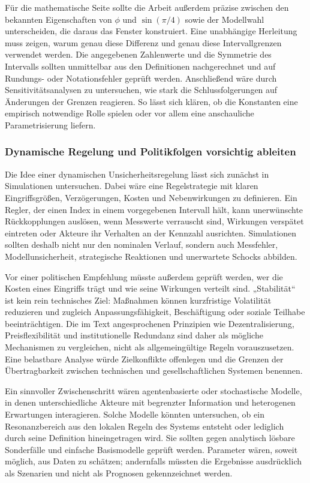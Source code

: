 \documentclass[a4paper,12pt,twoside]{report}
\theoremstyle{definition}
\begin{document}
Für die mathematische Seite sollte die Arbeit außerdem präzise zwischen den bekannten Eigenschaften von $\phi$ und $\sin(\pi/4)$ sowie der Modellwahl unterscheiden, die daraus das Fenster konstruiert. Eine unabhängige Herleitung muss zeigen, warum genau diese Differenz und genau diese Intervallgrenzen verwendet werden. Die angegebenen Zahlenwerte und die Symmetrie des Intervalls sollten unmittelbar aus den Definitionen nachgerechnet und auf Rundungs- oder Notationsfehler geprüft werden. Anschließend wäre durch Sensitivitätsanalysen zu untersuchen, wie stark die Schlussfolgerungen auf Änderungen der Grenzen reagieren. So lässt sich klären, ob die Konstanten eine empirisch notwendige Rolle spielen oder vor allem eine anschauliche Parametrisierung liefern.

\subsubsection{Dynamische Regelung und Politikfolgen vorsichtig ableiten}

Die Idee einer dynamischen Unsicherheitsregelung lässt sich zunächst in Simulationen untersuchen. Dabei wäre eine Regelstrategie mit klaren Eingriffsgrößen, Verzögerungen, Kosten und Nebenwirkungen zu definieren. Ein Regler, der einen Index in einem vorgegebenen Intervall hält, kann unerwünschte Rückkopplungen auslösen, wenn Messwerte verrauscht sind, Wirkungen verspätet eintreten oder Akteure ihr Verhalten an der Kennzahl ausrichten. Simulationen sollten deshalb nicht nur den nominalen Verlauf, sondern auch Messfehler, Modellunsicherheit, strategische Reaktionen und unerwartete Schocks abbilden.

Vor einer politischen Empfehlung müsste außerdem geprüft werden, wer die Kosten eines Eingriffs trägt und wie seine Wirkungen verteilt sind. „Stabilität“ ist kein rein technisches Ziel: Maßnahmen können kurzfristige Volatilität reduzieren und zugleich Anpassungsfähigkeit, Beschäftigung oder soziale Teilhabe beeinträchtigen. Die im Text angesprochenen Prinzipien wie Dezentralisierung, Preisflexibilität und institutionelle Redundanz sind daher als mögliche Mechanismen zu vergleichen, nicht als allgemeingültige Regeln vorauszusetzen. Eine belastbare Analyse würde Zielkonflikte offenlegen und die Grenzen der Übertragbarkeit zwischen technischen und gesellschaftlichen Systemen benennen.

Ein sinnvoller Zwischenschritt wären agentenbasierte oder stochastische Modelle, in denen unterschiedliche Akteure mit begrenzter Information und heterogenen Erwartungen interagieren. Solche Modelle könnten untersuchen, ob ein Resonanzbereich aus den lokalen Regeln des Systems entsteht oder lediglich durch seine Definition hineingetragen wird. Sie sollten gegen analytisch lösbare Sonderfälle und einfache Basismodelle geprüft werden. Parameter wären, soweit möglich, aus Daten zu schätzen; andernfalls müssten die Ergebnisse ausdrücklich als Szenarien und nicht als Prognosen gekennzeichnet werden.
\end{document}

